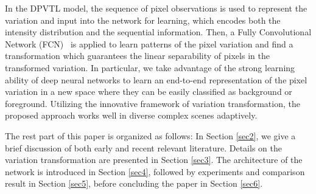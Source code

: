 \documentclass[journal]{IEEEtran}
\newcommand{\refsec}[1]{Section \ref{#1}}
\begin{document}
In the DPVTL model, 
the sequence of pixel observations is used to represent the variation and input into the network for learning,
which encodes both the intensity distribution and the sequential information.
%
Then, a Fully Convolutional Network (FCN)\ \cite{Shelhamer2017fcn} is applied to learn patterns of the pixel variation and find a transformation which guarantees the linear separability of pixels in the transformed variation.
%
In particular,
we take advantage of the strong learning ability of deep neural networks to learn an end-to-end representation of the pixel variation in a new space where they can be easily classified as background or foreground.
%
Utilizing the innovative framework of variation transformation,
the proposed approach works well in diverse complex scenes adaptively.
%
% 
% 
% 
% 

The rest part of this paper is organized as follows: In \refsec{sec2}, we give a brief discussion of both early and recent relevant literature. 
%
Details on the variation transformation are presented in \refsec{sec3}. The architecture of the network is introduced in \refsec{sec4}, followed by experiments and comparison result in \refsec{sec5}, before concluding the paper in \refsec{sec6}. 
\end{document}
